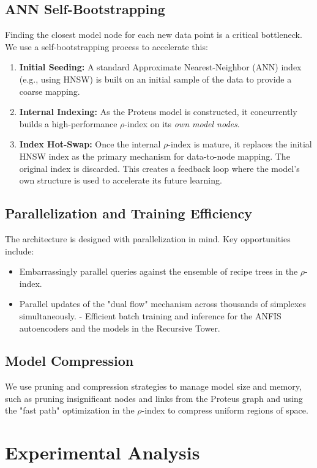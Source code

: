 \documentclass{article}
\begin{document}
\subsection{ANN Self-Bootstrapping}
Finding the closest model node for each new data point is a critical bottleneck. We use a self-bootstrapping process to accelerate this:
\begin{enumerate}
    \item \textbf{Initial Seeding:} A standard Approximate Nearest-Neighbor (ANN) index (e.g., using HNSW) is built on an initial sample of the data to provide a coarse mapping.
    \item \textbf{Internal Indexing:} As the Proteus model is constructed, it concurrently builds a high-performance $\rho$-index on its \textit{own model nodes}.
    \item \textbf{Index Hot-Swap:} Once the internal $\rho$-index is mature, it replaces the initial HNSW index as the primary mechanism for data-to-node mapping. The original index is discarded. This creates a feedback loop where the model's own structure is used to accelerate its future learning.
\end{enumerate}

\subsection{Parallelization and Training Efficiency}
The architecture is designed with parallelization in mind. Key opportunities include:
\begin{itemize}
    \item Embarrassingly parallel queries against the ensemble of recipe trees in the $\rho$-index.
    \item Parallel updates of the "dual flow" mechanism across thousands of simplexes simultaneously.
    - Efficient batch training and inference for the ANFIS autoencoders and the models in the Recursive Tower.
\end{itemize}

\subsection{Model Compression}
We use pruning and compression strategies to manage model size and memory, such as pruning insignificant nodes and links from the Proteus graph and using the "fast path" optimization in the $\rho$-index to compress uniform regions of space.

\section{Experimental Analysis}
\end{document}
